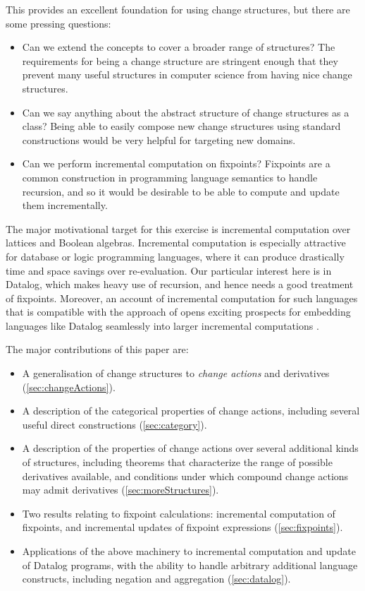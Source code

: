 This provides an excellent foundation for using change structures, but there are
some pressing questions:
\begin{itemize}
  \item Can we extend the concepts to cover a broader range of structures?
    The requirements for being a change structure are stringent enough that they
    prevent many useful structures in computer science from having nice change structures.
  \item Can we say anything about the abstract structure of change structures as
    a class? Being able to easily compose new change structures using standard
    constructions would be very helpful for targeting new domains.
  \item Can we perform incremental computation on fixpoints? Fixpoints are a
    common construction in programming language semantics to handle recursion,
    and so it would be desirable to be able to compute and update them incrementally.
\end{itemize}

The major motivational target for this exercise is incremental computation over
lattices and Boolean algebras. Incremental computation is especially attractive
for database or logic programming languages, where it can
produce drastically time and space savings over re-evaluation. Our particular
interest here is in Datalog, which makes heavy use of recursion, and hence needs
a good treatment of fixpoints. Moreover, an
account of incremental computation for such languages that is compatible with
the approach of \textcite{cai2014changes} opens exciting prospects for embedding
languages like Datalog seamlessly into larger incremental computations
\autocite[See][]{arntz2016datafun}.

The major contributions of this paper are:
\begin{itemize}
  \item A generalisation of change structures to \textit{change actions} and derivatives
    (\cref{sec:changeActions}).
  \item A description of the categorical properties of change actions, including
    several useful direct constructions (\cref{sec:category}).
  \item A description of the properties of change actions over several
    additional kinds of structures, including theorems that characterize the range of
    possible derivatives available, and conditions under which compound change
    actions may admit derivatives (\cref{sec:moreStructures}).
  \item Two results relating to fixpoint calculations: incremental computation
    of fixpoints, and incremental updates of fixpoint expressions (\cref{sec:fixpoints}).
  \item Applications of the above machinery to incremental computation and
    update of Datalog programs, with the ability to handle arbitrary additional
    language constructs, including negation and aggregation (\cref{sec:datalog}).
\end{itemize}

